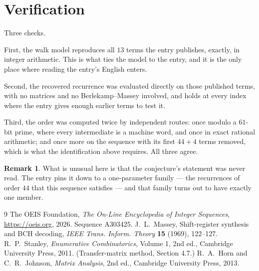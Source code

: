 \documentclass[11pt,a4paper]{article}
\theoremstyle{plain}
\theoremstyle{definition}
\newtheorem{remark}[theorem]{Remark}
\begin{document}
\section{Verification}

Three checks.

First, the walk model reproduces all $13$ terms the entry publishes, exactly, in integer
arithmetic. This is what ties the model to the entry, and it is the only place where reading
the entry's English enters.

Second, the recovered recurrence was evaluated directly on those published terms, with no
matrices and no Berlekamp--Massey involved, and holds at every index where the entry gives
enough earlier terms to test it.

Third, the order was computed twice by independent routes: once modulo a $61$-bit prime, where
every intermediate is a machine word, and once in exact rational arithmetic; and once more on
the sequence with its first $44+4$ terms removed, which is what the identification above
requires. All three agree.

\begin{remark}
What is unusual here is that the conjecture's statement was never read. The entry pins it down
to a one-parameter family --- the recurrences of order $44$ that this sequence satisfies
--- and that family turns out to have exactly one member.
\end{remark}

\begin{thebibliography}{9}
 The OEIS Foundation, \emph{The On-Line Encyclopedia of Integer
Sequences}, \url{https://oeis.org}, 2026. Sequence A303425.
 J.~L.~Massey, Shift-register synthesis and BCH decoding, \emph{IEEE
Trans. Inform. Theory} \textbf{15} (1969), 122--127.
 R.~P.~Stanley, \emph{Enumerative Combinatorics}, Volume 1, 2nd ed.,
Cambridge University Press, 2011. (Transfer-matrix method, Section 4.7.)
 R.~A.~Horn and C.~R.~Johnson, \emph{Matrix Analysis}, 2nd ed., Cambridge
University Press, 2013.
\end{thebibliography}
\end{document}
